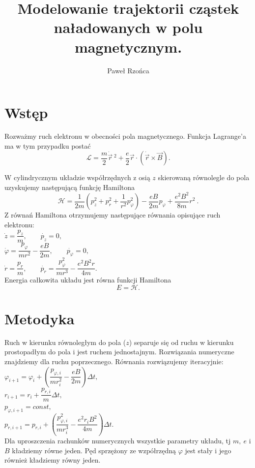 \documentclass[11pt]{article}
\title{Modelowanie trajektorii cząstek naładowanych w polu magnetycznym.}
\author{Paweł Rzońca}
\begin{document}
\maketitle

\section*{Wstęp}
Rozważmy ruch elektronu w obecności pola magnetycznego. Funkcja Lagrange'a ma w tym przypadku postać
\begin{equation}
	\mathcal{L} = \dfrac{m}{2}\dot{\vec{r}}\ ^2 +\dfrac{e}{2}\vec{r}\cdot (\dot{\vec{r}}\times\vec{B}).
\end{equation}

W cylindrycznym układzie współrzędnych z osią $z$ skierowaną równolegle do pola uzyskujemy następującą
funkcję Hamiltona
\begin{equation}
\mathcal{H}= \dfrac{1}{2m}\left( p_z^2+p_r^2+\dfrac{1}{r^2}p_{\varphi}^2\right)
	-\dfrac{eB}{2m}p_{\varphi}+\dfrac{e^2B^2}{8m}r^2\ .
\end{equation}
Z równań Hamiltona otrzymujemy następujące równania opisujące ruch elektronu:\\
$\dot{z}=\dfrac{p_z}{m}, \qquad \dot{p_z}=0,$\\
$\dot{\varphi}=\dfrac{p_{\varphi}}{mr^2}-\dfrac{eB}{2m} ,\qquad \dot{p_{\varphi}}=0,$\\
$\dot{r}=\dfrac{p_r}{m}, \qquad \dot{p_r} = \dfrac{p_{\varphi}^2}{mr^3}-\dfrac{e^2B^2r}{4m}.$\\

Energia całkowita układu jest równa funkcji Hamiltona
\begin{equation}
E=\mathcal{H}.
\end{equation}
\section*{Metodyka}
Ruch w kierunku równoległym do pola ($z$) separuje się od ruchu w kierunku prostopadłym do 
pola i jest ruchem jednostajnym. Rozwiązania numeryczne znajdziemy dla ruchu poprzecznego.
Równania rozwiązujemy iteracyjnie:\\
$\varphi_{i+1} = \varphi_i + \left( \dfrac{p_{\varphi ,i}}{mr_i^2}-\dfrac{eB}{2m}\right) \Delta t,$\\
$r_{i+1} = r_i+\dfrac{p_{r,i}}{m}\Delta t,$\\
$p_{\varphi,i+1} = const, $\\
$p_{r,i+1}=p_{r,i}+\left(\dfrac{p_{\varphi,i}^2}{mr_{i}^3}-\dfrac{e^2r_{i}B^2}{4m}\right)\Delta t.$\\
Dla uproszczenia rachunków numerycznych wszystkie parametry układu, tj $m,\ e$ i $B$ kładziemy równe jeden.
Pęd sprzężony ze wzpółrzędną $\varphi$ jest stały i jego również kładziemy równy jeden.
\end{document}
